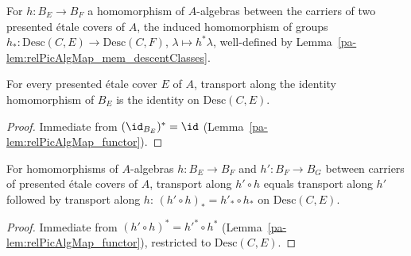 \begin{definition}
  \label{pa-def:descentMap}
  \leanok

  For \(h \colon B_E \to B_F\) a homomorphism of \(A\)-algebras between the carriers of two
  presented \'etale covers of \(A\), the induced homomorphism of groups \(h_{*} \colon
  \mathrm{Desc}(C,E) \to \mathrm{Desc}(C,F)\), \(\lambda \mapsto h^{*}\lambda\), well-defined by
  Lemma~\ref{pa-lem:relPicAlgMap_mem_descentClasses}.
\end{definition}

\begin{lemma}
  \label{pa-lem:descentMap_id}
  \leanok

  For every presented \'etale cover \(E\) of \(A\), transport along the identity homomorphism
  of \(B_E\) is the identity on \(\mathrm{Desc}(C,E)\).
\end{lemma}
\begin{proof}
  \leanok
  Immediate from \((\id_{B_E})^{*} = \id\) (Lemma~\ref{pa-lem:relPicAlgMap_functor}).
\end{proof}

\begin{lemma}
  \label{pa-lem:descentMap_comp}
  \leanok

  For homomorphisms of \(A\)-algebras \(h \colon B_E \to B_F\) and \(h' \colon B_F \to B_G\)
  between carriers of presented \'etale covers of \(A\), transport along \(h' \circ h\) equals
  transport along \(h'\) followed by transport along \(h\): \((h' \circ h)_{*} = h'_{*} \circ
  h_{*}\) on \(\mathrm{Desc}(C,E)\).
\end{lemma}
\begin{proof}
  \leanok
  Immediate from \((h' \circ h)^{*} = h'^{*} \circ h^{*}\) (Lemma~\ref{pa-lem:relPicAlgMap_functor}),
  restricted to \(\mathrm{Desc}(C,E)\).
\end{proof}

